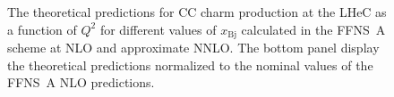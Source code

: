 \documentclass[pdftex,twocolumn,epjc3]{svjour3}          %
\newcommand{\xbj}{\ensuremath{x_{\text{Bj}}}\xspace}
\newcommand{\fonll} {{FONLL-B}\xspace}
\newcommand{\ffns} {{FFNS~A}\xspace}
\newcommand{\ffnsb} {{FFNS~B}\xspace}
\newcommand{\ffthreea} {{\hbox{HERAPDF2.0} FF3A}\xspace}
\newcommand{\ffthreeb} {{\hbox{HERAPDF2.0} FF3B}\xspace}
\begin{document}
%
%

\begin{figure}
  \centering
  \caption{The theoretical predictions
    for CC charm production at the LHeC as a function of $Q^2$ for
    different values of \xbj calculated in the \ffns scheme at NLO and
    approximate NNLO. The bottom panel display the theoretical
    predictions normalized to the nominal values of the \ffns NLO
    predictions.}
  \label{fig:thpred-q2-nnlo}
\end{figure}
\end{document}
